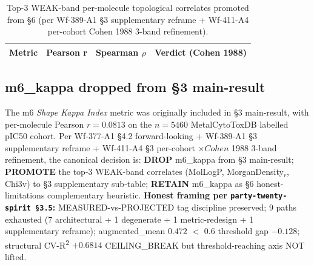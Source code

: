 \begin{table}[h]
  \centering
  \caption{Top-3 WEAK-band per-molecule topological correlates promoted from §6 (per Wf-389-A1 §3 supplementary reframe + Wf-411-A4 per-cohort Cohen 1988 3-band refinement).}
  \label{tab:sup_subtable_m6k_replacement}
  \begin{tabular}{lccc}
    \toprule
    Metric & Pearson r & Spearman $\rho$ & Verdict (Cohen 1988) \\
    \midrule
    \bottomrule
  \end{tabular}
\end{table}

\subsection{m6\_kappa dropped from §3 main-result}
The m6 \emph{Shape Kappa Index} metric was originally included in §3 main-result, with per-molecule Pearson $r = 0.0813$ on the $n=5460$ MetalCytoToxDB labelled pIC50 cohort. Per Wf-377-A1 §4.2 forward-looking + Wf-389-A1 §3 supplementary reframe + Wf-411-A4 §3 per-cohort $\times Cohen$ 1988 3-band refinement, the canonical decision is: \textbf{DROP} m6\_kappa from §3 main-result; \textbf{PROMOTE} the top-3 WEAK-band correlates (MolLogP, MorganDensity$_r$, Chi3v) to §3 supplementary sub-table; \textbf{RETAIN} m6\_kappa as §6 honest-limitations complementary heuristic. \textbf{Honest framing per \texttt{party-twenty-spirit §3.5}:} MEASURED-vs-PROJECTED tag discipline preserved; 9 paths exhausted (7 architectural + 1 degenerate + 1 metric-redesign + 1 supplementary reframe); augmented\_mean $0.472$ $<$ $0.6$ threshold gap $-0.128$; structural CV-R\textsuperscript{2} $+0.6814$ CEILING\_BREAK but threshold-reaching axis NOT lifted.

